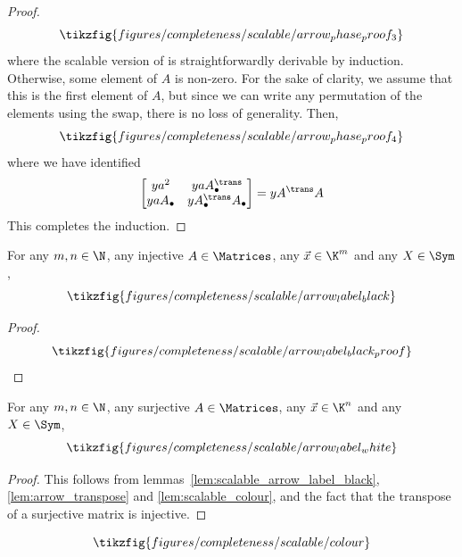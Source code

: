 \begin{proof}
\begin{equation}
    \tikzfig{figures/completeness/scalable/arrow_phase_proof_3}
  \end{equation}
  where the scalable version of \TextId is straightforwardly derivable by
  induction.
  Otherwise, some element of \(A\) is non-zero. For the sake of clarity,
  we assume that this is the first element of \(A\), but since we can
  write any permutation of the elements using the swap, there is no loss of
  generality. Then,
  \begin{equation}
    \tikzfig{figures/completeness/scalable/arrow_phase_proof_4}
  \end{equation}
  where we have identified
  \begin{equation}
    \begin{bmatrix}
      ya^2 & ya A_\bullet^\trans \\
      ya A_\bullet & y A_\bullet^\trans A_\bullet
    \end{bmatrix} = yA^\trans A
  \end{equation}
  This completes the induction.
\end{proof}
\begin{lemma}
  \label{lem:scalable_arrow_label_black}
  For any \(m,n \in \N\), any injective \(A \in  \Matrices\), any \(\vec x \in \K^m\)
  and any \(X \in \Sym\),
  \begin{equation*}
    \tikzfig{figures/completeness/scalable/arrow_label_black}
  \end{equation*}
\end{lemma}
\begin{proof}
  \begin{equation}
    \tikzfig{figures/completeness/scalable/arrow_label_black_proof}
  \end{equation}
\end{proof}
\begin{lemma}
  \label{lem:scalable_arrow_label_white}
  For any \(m,n \in \N\), any surjective \(A \in \Matrices\), any \(\vec x \in \K^n\)
  and any \(X \in \Sym\),
  \begin{equation*}
    \tikzfig{figures/completeness/scalable/arrow_label_white}
  \end{equation*}
\end{lemma}
\begin{proof}
  This follows from lemmas~\ref{lem:scalable_arrow_label_black},
  \ref{lem:arrow_transpose} and \ref{lem:scalable_colour}, and the fact that
  the transpose of a surjective matrix is injective.
\end{proof}
\begin{lemma}
\label{lem:scalable_colour_actual}
\[\tikzfig{figures/completeness/scalable/colour}\]
\end{lemma}
